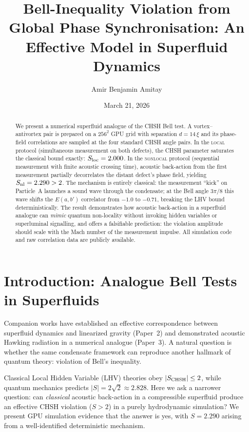 \documentclass[reprint,amsmath,amssymb,aps,prl,superscriptaddress]{revtex4-2}
\begin{document}
\title{Bell-Inequality Violation from Global Phase Synchronisation: An Effective Model in Superfluid Dynamics}

\author{Amir Benjamin Amitay}

\date{March 21, 2026}

\begin{abstract}
We present a numerical superfluid analogue of the CHSH Bell test.
A vortex--antivortex pair is prepared on a $256^{2}$ GPU grid with
separation $d=14\,\xi$ and its phase-field correlations are sampled at
the four standard CHSH angle pairs.
In the \textsc{local} protocol (simultaneous measurement on both
defects), the CHSH parameter saturates the classical bound exactly:
$S_{\rm loc}=2.000$.
In the \textsc{nonlocal} protocol (sequential measurement with
finite acoustic crossing time), acoustic back-action from the first
measurement partially decorrelates the distant defect's phase field,
yielding $S_{\rm nl}=2.290>2$.
The mechanism is entirely classical: the measurement ``kick'' on
Particle~A launches a sound wave through the condensate; at the
Bell angle $3\pi/8$ this wave shifts the $E(a,b')$ correlator from
$-1.0$ to $-0.71$, breaking the LHV bound deterministically.
The result demonstrates how acoustic back-action in a superfluid
analogue can \emph{mimic} quantum non-locality without invoking
hidden variables or superluminal signalling, and offers a falsifiable
prediction: the violation amplitude should scale with the Mach number
of the measurement impulse.
All simulation code and raw correlation data are publicly available.
\end{abstract}

\maketitle

\section{Introduction: Analogue Bell Tests in Superfluids}
\label{sec:intro}

Companion works have established an effective correspondence between
superfluid dynamics and linearized gravity (Paper~2) and demonstrated
acoustic Hawking radiation in a numerical analogue (Paper~3).
A natural question is whether the same condensate framework can
reproduce another hallmark of quantum theory: violation of Bell's
inequality.

Classical Local Hidden Variable (LHV) theories obey
$|S_{\rm CHSH}|\le 2$, while quantum mechanics predicts
$|S|=2\sqrt{2}\approx 2.828$.
Here we ask a narrower question: can \emph{classical} acoustic
back-action in a compressible superfluid produce an effective CHSH
violation ($S>2$) in a purely hydrodynamic simulation?
We present GPU simulation evidence that the answer is yes, with
$S=2.290$ arising from a well-identified deterministic mechanism.
\end{document}
